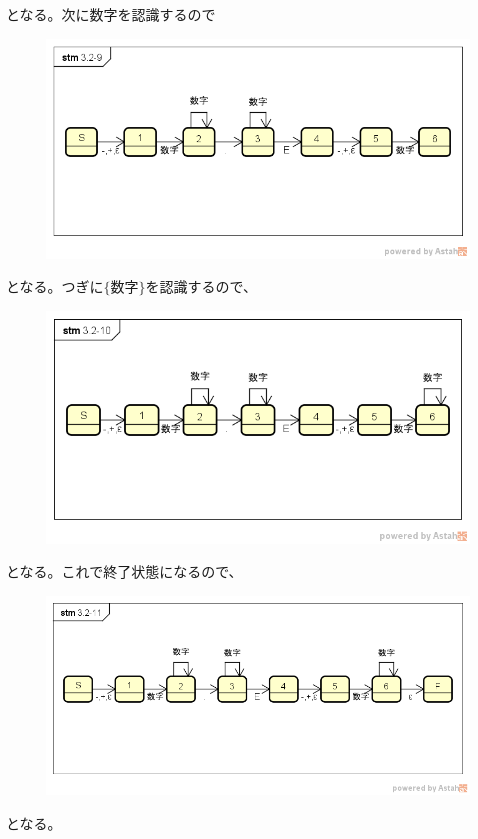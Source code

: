 \documentclass[a4paper,12pt]{jarticle}
\begin{document}
となる。次に$ 数字 $を認識するので
\begin{figure}[H]
 \begin{center}
  \includegraphics[width=15cm]{Automatonfig/3-2-9.png}
 \end{center}
\end{figure}
となる。つぎに$ \{ 数字 \} $を認識するので、
\begin{figure}[H]
 \begin{center}
  \includegraphics[width=15cm]{Automatonfig/3-2-10.png}
 \end{center}
\end{figure}
となる。これで終了状態になるので、
\begin{figure}[H]
 \begin{center}
  \includegraphics[width=15cm]{Automatonfig/3-2-11.png}
 \end{center}
\end{figure}
となる。
\end{document}

